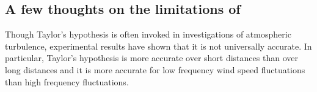 \subsection{A few thoughts on the limitations of }
Though Taylor’s hypothesis is often invoked in investigations of atmospheric turbulence, experimental results have shown that it is not universally accurate.\cite{higgins2012, schlipf2010}  In particular, Taylor’s hypothesis is more accurate over short distances than over long distances and it is more accurate for low frequency wind speed fluctuations than high frequency fluctuations.

